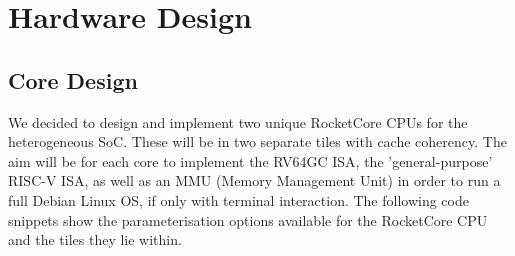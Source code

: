 \chapter{Hardware Design}
\label{ch:hw_design}
\section{Core Design}
We decided to design and implement two unique RocketCore CPUs for the heterogeneous SoC. These will be in two separate tiles with cache coherency. The aim will be for each core to implement the RV64GC ISA, the 'general-purpose' RISC-V ISA, as well as an MMU (Memory Management Unit) in order to run a full Debian Linux OS, if only with terminal interaction. The following code snippets show the parameterisation options available for the RocketCore CPU and the tiles they lie within.


